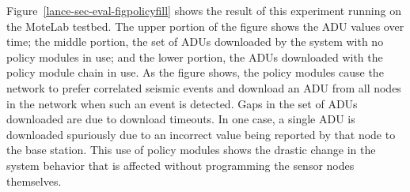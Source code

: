Figure~\ref{lance-sec-eval-figpolicyfill} shows the result of this experiment
running on the MoteLab testbed. The upper portion of the figure shows the ADU
values over time; the middle portion, the set of ADUs downloaded by the
system with no policy modules in use; and the lower portion, the ADUs
downloaded with the policy module chain in use.  As the figure shows, the
policy modules cause the network to prefer correlated seismic events and
download an ADU from all nodes in the network when such an event is detected.
Gaps in the set of ADUs downloaded are due to download timeouts. In one case,
a single ADU is downloaded spuriously due to an incorrect value being
reported by that node to the base station. This use of policy modules shows
the drastic change in the system behavior that is affected without
programming the sensor nodes themselves.




